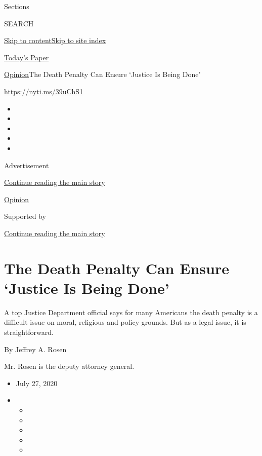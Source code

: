 Sections

SEARCH

\protect\hyperlink{site-content}{Skip to
content}\protect\hyperlink{site-index}{Skip to site index}

\href{https://myaccount.nytimes.com/auth/login?response_type=cookie\&client_id=vi}{}

\href{https://www.nytimes.com/section/todayspaper}{Today's Paper}

\href{/section/opinion}{Opinion}\textbar{}The Death Penalty Can Ensure
`Justice Is Being Done'

\href{https://nyti.ms/39uChS1}{https://nyti.ms/39uChS1}

\begin{itemize}
\item
\item
\item
\item
\item
\end{itemize}

Advertisement

\protect\hyperlink{after-top}{Continue reading the main story}

\href{/section/opinion}{Opinion}

Supported by

\protect\hyperlink{after-sponsor}{Continue reading the main story}

\hypertarget{the-death-penalty-can-ensure-justice-is-being-done}{%
\section{The Death Penalty Can Ensure `Justice Is Being
Done'}\label{the-death-penalty-can-ensure-justice-is-being-done}}

A top Justice Department official says for many Americans the death
penalty is a difficult issue on moral, religious and policy grounds. But
as a legal issue, it is straightforward.

By Jeffrey A. Rosen

Mr. Rosen is the deputy attorney general.

\begin{itemize}
\item
  July 27, 2020
\item
  \begin{itemize}
  \item
  \item
  \item
  \item
  \item
  \end{itemize}
\end{itemize}

